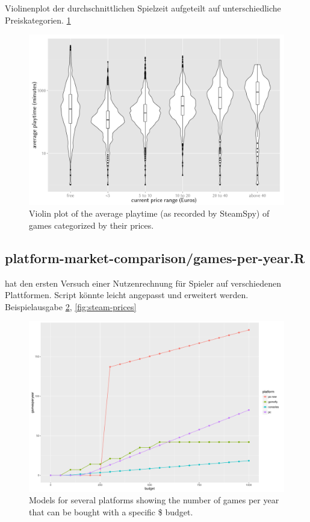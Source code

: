 Violinenplot der durchschnittlichen Spielzeit aufgeteilt auf unterschiedliche Preiskategorien. \ref{fig:steam-cost-vs-playtime-violin}

\begin{figure}[!t]
	\centering
	\includegraphics[width=1.0\columnwidth]{images/steam-cost-vs-playtime.pdf}
	\caption{Violin plot of the average playtime (as recorded by SteamSpy) of games categorized by their prices.}
\label{fig:steam-cost-vs-playtime-violin}
\end{figure}



\subsection{platform-market-comparison/games-per-year.R}

 hat den ersten Versuch einer Nutzenrechnung für Spieler auf verschiedenen Plattformen. Script könnte leicht angepasst und erweitert werden. Beispielausgabe \ref{fig:gamesperyear-over-budget}, \ref{fig:steam-prices}

\begin{figure}[!t]
	\centering
	\includegraphics[width=1.0\columnwidth]{images/gamesperyear-over-budget.pdf}
	\caption{Models for several platforms showing the number of games per year that can be bought with a specific \$ budget.}
\label{fig:gamesperyear-over-budget}
\end{figure}

